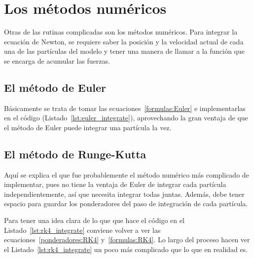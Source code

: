 
\section{Los métodos numéricos}
Otras de las rutinas complicadas son los métodos numéricos.
Para integrar la ecuación de Newton, se requiere saber la posición y la velocidad actual de cada una de las partículas del modelo y tener una manera de llamar a la función que se encarga de acumular las fuerzas.

\subsection{El método de Euler}
Básicamente se trata de tomar las ecuaciones~\eqref{formulas:Euler} e implementarlas en el código (Listado~\ref{lst:euler_integrate}), aprovechando la gran ventaja de que el método de Euler puede integrar una partícula la vez.


\subsection{El método de Runge-Kutta}
Aquí se explica el que fue probablemente el método numérico más complicado de implementar, pues no tiene la ventaja de Euler de integrar cada partícula independientemente, así que necesita integrar todas juntas.
Además, debe tener espacio para guardar los ponderadores del paso de integración de cada partícula.

Para tener una idea clara de lo que que hace el código en el Listado~\ref{lst:rk4_integrate} conviene volver a ver las ecuaciones~\eqref{ponderadores:RK4} y~\eqref{formulas:RK4}.
Lo largo del proceso hacen ver el Listado~\ref{lst:rk4_integrate} un poco más complicado que lo que en realidad es.

